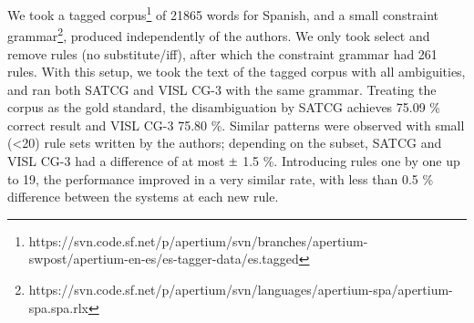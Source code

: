 \documentclass[11pt]{article}
\newcommand{\Mypm}{\mathbin{\tikz [x=1.4ex,y=1.4ex,line width=.1ex] \draw (0.0,0) -- (1.0,0) (0.5,0.08) -- (0.5,0.92) (0.0,0.5) -- (1.0,0.5);}}%
\begin{document}
We took a tagged corpus\footnote{https://svn.code.sf.net/p/apertium/svn/branches/apertium-swpost/apertium-en-es/es-tagger-data/es.tagged} of 21865 words for Spanish, 
and a small constraint grammar\footnote{https://svn.code.sf.net/p/apertium/svn/languages/apertium-spa/apertium-spa.spa.rlx}, produced independently of the authors.
We only took select and remove rules (no substitute/iff), after which the constraint grammar had 261 rules.
With this setup, we took the text of the tagged corpus with all
ambiguities, and ran both SATCG and VISL CG-3 with the same grammar. 
Treating the corpus as the gold standard, the disambiguation by
SATCG achieves 75.09 \% correct result and VISL CG-3 75.80 \%.
Similar patterns were observed with small (\textless{}20) rule sets
written by the authors; depending on the subset, SATCG and VISL CG-3 had
a difference of at most $\Mypm$ 1.5 \%. 
Introducing rules one by one up to 19, the
performance improved in a very similar rate, with less than 0.5 \%
difference between the systems at each new rule.

\end{document}
